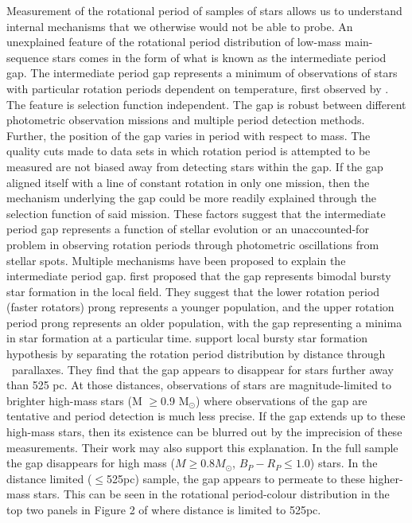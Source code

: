 Measurement of the rotational period of samples of stars allows us to understand internal mechanisms that we otherwise would not be able to probe.
An unexplained feature of the rotational period distribution of low-mass main-sequence stars comes in the form of what is known as the intermediate period gap.
The intermediate period gap represents a minimum of observations of stars with particular rotation periods dependent on temperature, first observed by \citet{mcquillan_rotation_2014}.
The feature is selection function independent.
The gap is robust between different photometric observation missions \citep{mcquillan_rotation_2014,davenport_rotating_2017,davenport_rotating_2018,lu_bridging_2022} and multiple period detection methods.
Further, the position of the gap varies in period with respect to mass. 
The quality cuts made to data sets in which rotation period is attempted to be measured \citep[e.g. removing binaries and subgiants][]{mcquillan_rotation_2014, claytor_tess_2023} are not biased away from detecting stars within the gap.
If the gap aligned itself with a line of constant rotation in only one mission, then the mechanism underlying the gap could be more readily explained through the selection function of said mission.
These factors suggest that the intermediate period gap represents a function of stellar evolution or an unaccounted-for problem in observing rotation periods through photometric oscillations from stellar spots.
Multiple mechanisms have been proposed to explain the intermediate period gap.
\citet{mcquillan_rotation_2014} first proposed that the gap represents bimodal bursty star formation in the local \kepler{} field.
They suggest that the lower rotation period (faster rotators) prong represents a younger population, and the upper rotation period prong represents an older population, with the gap representing a minima in star formation at a particular time.
\citet{davenport_rotating_2018} support local bursty star formation hypothesis by separating the \kepler{} rotation period distribution by distance through \gaia{} \ parallaxes.
They find that the gap appears to disappear for stars further away than 525 pc.
At those distances, observations of stars are magnitude-limited to brighter high-mass stars (M $\geq$0.9 M$_{\odot}$) where observations of the gap are tentative and period detection is much less precise.
If the gap extends up to these high-mass stars, then its existence can be blurred out by the imprecision of these measurements.
Their work may also support this explanation.
In the full \citep{mcquillan_rotation_2014} sample the gap disappears for high mass ($M \geq 0.8 M_{\odot}$, $B_P - R_P \leq 1.0$) stars.
In the distance limited ($\leq$525pc) sample, the gap appears to permeate to these higher-mass stars. 
This can be seen in the rotational period-colour distribution in the top two panels in Figure 2 of \citet{davenport_rotating_2018} where distance is limited to 525pc.

